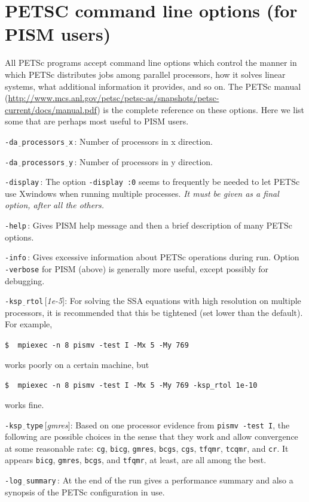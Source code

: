 \documentclass[11pt,final]{amsart}
\renewcommand{\t}[1]{\texttt{#1}}
\newcommand{\rawopt}[1]{\vspace{1mm}\noindent \large\texttt{-#1}\normalsize}
\newcommand{\opt}[1]{\rawopt{#1}\,:\quad}
\newcommand{\optdef}[2]{\rawopt{#1}\,[\textsl{#2}]:\quad}
\newcommand{\und}{$\underline{\,\,\,}$}
\begin{document}
\clearpage\newpage
\section{PETSC command line options (for PISM users)}  All PETSc programs accept command line options which control the manner in which PETSc distributes jobs among parallel processors, how it solves linear systems, what additional information it provides, and so on.  The PETSc manual (\url{http://www.mcs.anl.gov/petsc/petsc-as/snapshots/petsc-current/docs/manual.pdf}) is the complete reference on these options.  Here we list some that are perhaps most useful to PISM users.

\opt{da\und processors\und x}  Number of processors in x direction.

\opt{da\und processors\und y}  Number of processors in y direction.

\opt{display}  The option \verb|-display :0| seems to frequently be needed to let PETSc use Xwindows when running multiple processes.  \emph{It must be given as a \emph{final} option, after all the others.}

\opt{help}  Gives PISM help message and then a brief description of many PETSc options.

\opt{info}  Gives excessive information about PETSc operations during run.  Option \verb|-verbose| for PISM (above) is generally more useful, except possibly for debugging.

\optdef{ksp\und rtol}{1e-5}  For solving the SSA equations with high resolution on multiple processors, it is recommended that this be tightened (set lower than the default).  For example, 

\verb|$  mpiexec -n 8 pismv -test I -Mx 5 -My 769|

\noindent works poorly on a certain machine, but

\verb|$  mpiexec -n 8 pismv -test I -Mx 5 -My 769 -ksp_rtol 1e-10|

\noindent works fine.

\optdef{ksp\und type}{gmres}  Based on one processor evidence from \verb|pismv -test I|, the following are possible choices in the sense that they work and allow convergence at some reasonable rate: \t{cg}, \t{bicg}, \t{gmres}, \t{bcgs}, \t{cgs}, \t{tfqmr}, \t{tcqmr}, and \t{cr}.  It appears \t{bicg}, \t{gmres}, \t{bcgs}, and \t{tfqmr}, at least, are all among the best.

\opt{log\und summary}  At the end of the run gives a performance summary and also a synopsis of the PETSc configuration in use.
\end{document}
